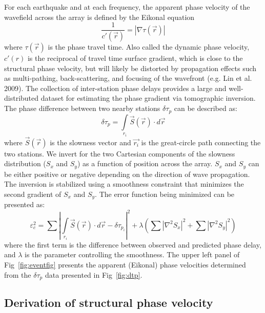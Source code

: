 \documentclass{gji}
\begin{document}
For each earthquake and at each frequency, the apparent phase velocity of the wavefield across the array is defined by the Eikonal equation 
\[
\frac{1}{c'(\vec{r})} = |\nabla \tau(\vec{r})|
\]
where $\tau(\vec{r})$ is the phase travel time. Also called the dynamic phase velocity, $c'(r)$ is the reciprocal of travel time surface gradient, which is close to the structural phase velocity, but will likely be distorted by propagation effects such as multi-pathing, back-scattering, and focusing of the wavefront (e.g. Lin et al. 2009).  The collection of inter-station phase delays provides a large and well-distributed dataset for estimating the phase gradient via tomographic inversion. The phase difference between two nearby stations $\delta \tau_p$ can be described as:
\[
\delta \tau_p = \int\limits_{r_i} \vec{S}(\vec{r}) \cdot d\vec{r}
\]
where $\vec{S}(\vec{r})$ is the slowness vector and $\vec{r_i}$ is the great-circle path connecting the two stations. We invert for the two Cartesian components of the slowness distribution ($S_x$ and $S_y$) as a function of position across the array. $S_x$ and $S_y$ can be either positive or negative depending on the direction of wave propagation.  The inversion is stabilized using a smoothness constraint that minimizes the second gradient of $S_x$ and $S_y$. The error function being minimized can be presented as:
\[
\varepsilon_{c}^2 = \sum \left| \int\limits_{r_i} \vec{S}(\vec{r}) \cdot d\vec{r} - \delta \tau_{p_i}\right|^2 + \lambda \left( \sum |\nabla^2 S_x|^2 + \sum |\nabla^2 S_y|^2 \right)
\]
where the first term is the difference between observed and predicted phase delay, and $\lambda$ is the parameter controlling the smoothness. The upper left panel of Fig~\ref{fig:eventfig} presents the apparent (Eikonal) phase velocities determined from the $\delta \tau_p$ data presented in Fig~\ref{fig:dtp}.    


\subsection{Derivation of structural phase velocity}
\end{document}
